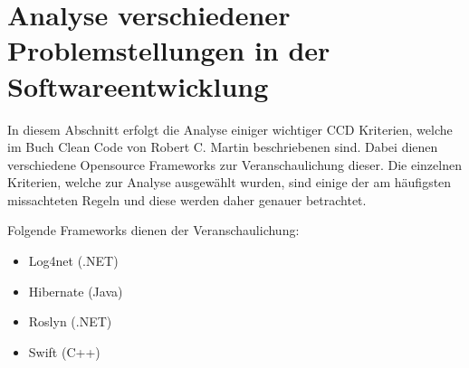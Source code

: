 \chapter{Analyse verschiedener Problemstellungen in der Softwareentwicklung}

\SuperPar In diesem Abschnitt erfolgt die Analyse einiger wichtiger CCD Kriterien, welche im Buch Clean Code von Robert C. Martin beschriebenen sind. Dabei dienen verschiedene Opensource Frameworks zur Veranschaulichung dieser. Die einzelnen Kriterien, welche zur Analyse ausgewählt wurden, sind einige der am häufigsten missachteten Regeln und diese werden daher genauer betrachtet.

\SuperPar Folgende Frameworks dienen der Veranschaulichung:

\begin{itemize}
	\item Log4net (.NET)
	\item Hibernate (Java)
	\item Roslyn (.NET)
	\item Swift (C++)
\end{itemize}
\newpage